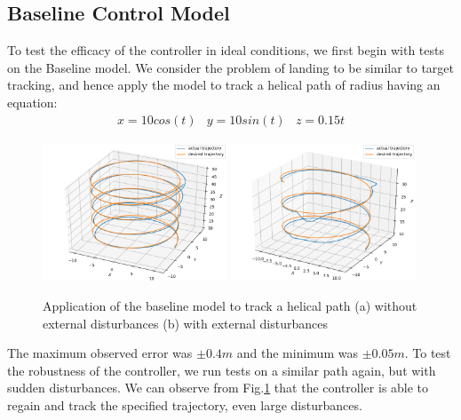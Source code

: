 \documentclass[conf]{new-aiaa}
\begin{document}
\subsection{Baseline Control Model} \label{sec:baseline_results}
To test the efficacy of the controller in ideal conditions, we first begin with tests on the Baseline model. We consider the problem of landing to be similar to target tracking, and hence apply the model to track a helical path of radius having an equation:
\begin{eqnarray}
x = 10cos(t) & 
y = 10sin(t) & 
z = 0.15t
\end{eqnarray}

\begin{figure}[h]
	\centering
	\includegraphics[width=0.49\textwidth]{helix.png}
	\includegraphics[width=0.49\textwidth]{helix_dist.png}
	\caption{Application of the baseline model to track a helical path (a) without external disturbances (b) with external disturbances}  \label{fig:helix}
\end{figure}

The maximum observed error was $\pm0.4m$ and the minimum was $\pm0.05m$. To test the robustness of the controller, we run tests on a similar path again, but with sudden disturbances. We can observe from Fig.\ref{fig:helix} that the controller is able to regain and track the specified trajectory, even large disturbances.
\end{document}
